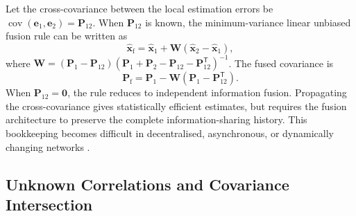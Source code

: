 \documentclass[graybox,envcountchap]{style/SNmono}
\begin{document}
Let the cross-covariance between the local estimation errors be $\operatorname{cov}(\mathbf{e}_{1},\mathbf{e}_{2})=\mathbf{P}_{12}$. When $\mathbf{P}_{12}$ is known, the minimum-variance linear unbiased
fusion rule can be written as
\begin{equation}
\widehat{\mathbf{x}}_{\mathrm{f}}=\widehat{\mathbf{x}}_{1}+\mathbf{W}\left(\widehat{\mathbf{x}}_{2}-\widehat{\mathbf{x}}_{1}\right),
\label{eq:correlated-track-fusion-state}
\end{equation}
where $\mathbf{W}=\left(\mathbf{P}_{1}-\mathbf{P}_{12}\right)\left(\mathbf{P}_{1}+\mathbf{P}_{2}-\mathbf{P}_{12}-\mathbf{P}_{12}^{\mathsf T}\right)^{-1}$. The fused covariance is
\begin{equation}
\mathbf{P}_{\mathrm{f}}=\mathbf{P}_{1}-\mathbf{W}\left(\mathbf{P}_{1}-\mathbf{P}_{12}^{\mathsf T}\right).
\label{eq:correlated-track-fusion-cov}
\end{equation}
When $\mathbf{P}_{12}=\mathbf{0}$, the rule reduces to independent
information fusion. Propagating the cross-covariance gives statistically
efficient estimates, but requires the fusion architecture to preserve the
complete information-sharing history. This bookkeeping becomes difficult
in decentralised, asynchronous, or dynamically changing networks
\cite{barshalom1995multitarget,saha1998track,
barshalom2011tracking}.


\subsection{Unknown Correlations and Covariance Intersection}
\end{document}
